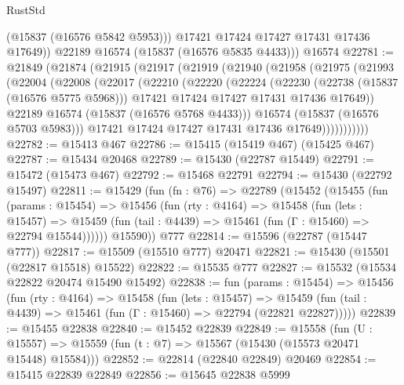 \begin{lexlean}{RustStd}
\begin{coremodule}
            (@15837 (@16576 @5842 @5953)))
          @17421
          @17424
          @17427
          @17431
          @17436
          @17649))
      @22189
      @16574
      (@15837 (@16576 @5835 @4433)))
    @16574
@22781 := @21849
    (@21874
      (@21915
        (@21917
          (@21919
            (@21940
              (@21958
                (@21975
                  (@21993
                    (@22004
                      (@22008
                        (@22017
                          (@22210
                            (@22220
                              (@22224
                                (@22230
                                  (@22738 (@15837 (@16576 @5775 @5968)))
                                  @17421
                                  @17424
                                  @17427
                                  @17431
                                  @17436
                                  @17649))
                              @22189
                              @16574
                              (@15837 (@16576 @5768 @4433)))
                            @16574
                            (@15837 (@16576 @5703 @5983)))
                          @17421
                          @17424
                          @17427
                          @17431
                          @17436
                          @17649)))))))))))
@22782 := @15413 @467
@22786 := @15415 (@15419 @467) (@15425 @467)
@22787 := @15434 @20468
@22789 := @15430 (@22787 @15449)
@22791 := @15472 (@15473 @467)
@22792 := @15468 @22791
@22794 := @15430 (@22792 @15497)
@22811 := @15429
    (fun (fn : @76) =>
    @22789
      (@15452
        (@15455
          (fun (params : @15454) =>
          @15456
            (fun (rty : @4164) =>
            @15458
              (fun (lets : @15457) =>
              @15459 (fun (tail : @4439) => @15461 (fun (Γ : @15460) => @22794 @15544))))))
        @15590))
    @777
@22814 := @15596 (@22787 (@15447 @777))
@22817 := @15509 (@15510 @777) @20471
@22821 := @15430 (@15501 (@22817 @15518) @15522)
@22822 := @15535 @777
@22827 := @15532 (@15534 @22822 @20474 @15490 @15492)
@22838 := fun (params : @15454) =>
  @15456
    (fun (rty : @4164) =>
    @15458
      (fun (lets : @15457) =>
      @15459 (fun (tail : @4439) => @15461 (fun (Γ : @15460) => @22794 (@22821 @22827)))))
@22839 := @15455 @22838
@22840 := @15452 @22839
@22849 := @15558
    (fun (U : @15557) => @15559 (fun (t : @7) => @15567 (@15430 (@15573 @20471 @15448) @15584)))
@22852 := @22814 (@22840 @22849) @20469
@22854 := @15415 @22839 @22849
@22856 := @15645 @22838 @5999

\end{coremodule}
\end{lexlean}
